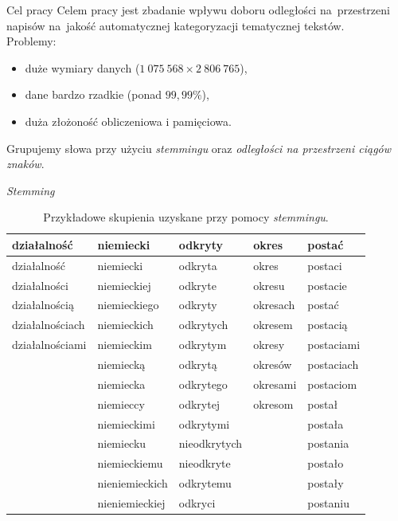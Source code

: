 \documentclass[11pt,pdftex,mathserif]{beamer}
\theoremstyle{definition}
\begin{document}
\begin{frame}{Cel pracy}
Celem pracy jest zbadanie wpływu doboru odległości na~przestrzeni napisów na~jakość automatycznej kategoryzacji tematycznej tekstów. \\
\pause
Problemy:
\begin{itemize}
\item duże wymiary danych ($1\ 075\ 568 \times 2\ 806\ 765$),
\item dane bardzo rzadkie (ponad $99{,}99\%$),
\item duża złożoność obliczeniowa i pamięciowa.
\end{itemize}
\pause
Grupujemy słowa przy użyciu \emph{stemmingu} oraz \emph{odległości na przestrzeni ciągów znaków}.
\end{frame}



\begin{frame}{\emph{Stemming}}
\begin{table}[h]
\centering
\caption{Przykładowe skupienia uzyskane przy pomocy \emph{stemmingu}.}
\begin{tabular}{|lllll|}
  \hline
działalność & niemiecki & odkryty & okres & postać \\ 
  \hline
działalność & niemiecki & odkryta & okres & postaci \\ 
  działalności & niemieckiej & odkryte & okresu & postacie \\ 
  działalnością & niemieckiego & odkryty & okresach & postać \\ 
  działalnościach & niemieckich & odkrytych & okresem & postacią \\ 
  działalnościami & niemieckim & odkrytym & okresy & postaciami \\ 
   & niemiecką & odkrytą & okresów & postaciach \\ 
   & niemiecka & odkrytego & okresami & postaciom \\ 
   & niemieccy & odkrytej & okresom & postał \\ 
   & niemieckimi & odkrytymi &  & postała \\ 
   & niemiecku & nieodkrytych &  & postania \\ 
   & niemieckiemu & nieodkryte &  & postało \\ 
   & nieniemieckich & odkrytemu &  & postały \\ 
   & nieniemieckiej & odkryci &  & postaniu \\ 
   \hline
\end{tabular}
\end{table}

\end{frame}
\end{document}
